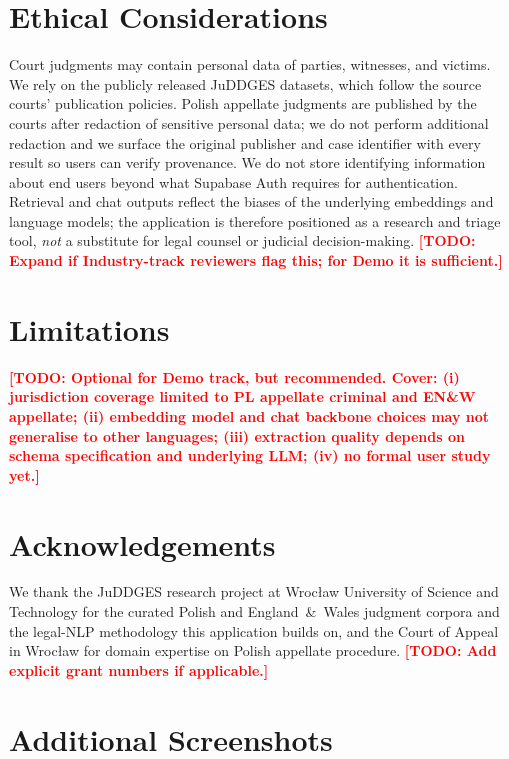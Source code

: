 \documentclass[11pt]{article}
\newcommand{\todo}[1]{\textcolor{red}{\textbf{[TODO: #1]}}}
\begin{document}
\section*{Ethical Considerations}
\label{sec:ethics}

Court judgments may contain personal data of parties, witnesses, and
victims. We rely on the publicly released JuDDGES datasets, which
follow the source courts' publication policies. Polish appellate
judgments are published by the courts after redaction of sensitive
personal data; we do not perform additional redaction and we surface
the original publisher and case identifier with every result so users
can verify provenance. We do not store identifying information about
end users beyond what Supabase Auth requires for authentication.
Retrieval and chat outputs reflect the biases of the underlying
embeddings and language models; the application is therefore positioned
as a research and triage tool, \emph{not} a substitute for legal
counsel or judicial decision-making. \todo{Expand if Industry-track
reviewers flag this; for Demo it is sufficient.}

\section*{Limitations}
\label{sec:limitations}

\todo{Optional for Demo track, but recommended. Cover: (i) jurisdiction
coverage limited to PL appellate criminal and EN\&W appellate; (ii)
embedding model and chat backbone choices may not generalise to other
languages; (iii) extraction quality depends on schema specification
and underlying LLM; (iv) no formal user study yet.}

\section*{Acknowledgements}

We thank the JuDDGES research project at Wroc\l{}aw University of
Science and Technology for the curated Polish and England~\&~Wales
judgment corpora and the legal-NLP methodology this application builds
on, and the Court of Appeal in Wroc\l{}aw for domain expertise on
Polish appellate procedure. \todo{Add explicit grant numbers if
applicable.}




\appendix

\section{Additional Screenshots}
\label{app:screenshots}
\end{document}
